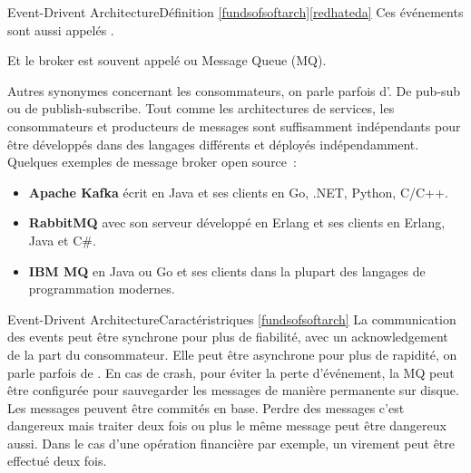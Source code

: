 \documentclass{beamer}
\begin{document}
    \begin{frame}{Event-Drivent Architecture}{Définition \cref{fundsofsoftarch}\footnotestep\cref{redhateda}}
        Ces événements sont aussi appelés .

        Et le broker est souvent appelé  ou Message Queue (MQ).

        Autres synonymes concernant les consommateurs, on parle parfois d'.
        De pub-sub ou de publish-subscribe.
        \bigbreak
        Tout comme les architectures de services, les consommateurs et producteurs de messages sont suffisamment indépendants pour être développés dans des langages différents et déployés indépendamment.
        \bigbreak
        Quelques exemples de message broker open source~:
        \begin{itemize}
            \item \textbf{Apache Kafka} écrit en Java et ses clients en Go, .NET, Python, C/C++.
            \item \textbf{RabbitMQ} avec son serveur développé en Erlang et ses clients en Erlang, Java et C\#.
            \item \textbf{IBM MQ} en Java ou Go et ses clients dans la plupart des langages de programmation modernes.
        \end{itemize}
    \end{frame}

    \begin{frame}{Event-Drivent Architecture}{Caractéristriques \cref{fundsofsoftarch}}
        La communication des events peut être synchrone pour plus de fiabilité, avec un acknowledgement de la part du consommateur.
        \bigbreak
        Elle peut être asynchrone pour plus de rapidité, on parle parfois de .
        \bigbreak
        En cas de crash, pour éviter la perte d'événement, la MQ peut être configurée pour sauvegarder les messages de manière permanente sur disque.
        Les messages peuvent être commités en base.
        \bigbreak
        Perdre des messages c'est dangereux mais traiter deux fois ou plus le même message peut être dangereux aussi.
        Dans le cas d'une opération financière par exemple, un virement peut être effectué deux fois.
    \end{frame}
\end{document}
